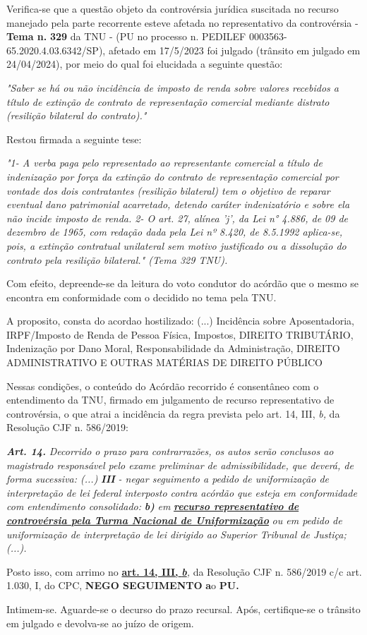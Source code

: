 \documentclass[12pt]{article}
\begin{document}
\justifying
\noindent Verifica-se que a questão objeto da controvérsia jurídica suscitada no recurso manejado pela parte recorrente esteve afetada no representativo da controvérsia - \textbf{Tema n. }\textbf{329} da TNU - (PU no processo n. PEDILEF 0003563-65.2020.4.03.6342/SP),  afetado em 17/5/2023 foi julgado (trânsito em julgado em 24/04/2024), por meio do qual foi elucidada a seguinte questão:

\noindent \textit{"Saber se há ou não incidência de imposto de renda sobre valores recebidos a título de extinção de contrato de representação comercial mediante distrato (resilição bilateral do contrato)."}

\noindent Restou firmada a seguinte tese:

\noindent \textit{"1- A verba paga pelo representado ao representante comercial a título de indenização por força da extinção do contrato de representação comercial por vontade dos dois contratantes (resilição bilateral) tem o objetivo de reparar eventual dano patrimonial acarretado, detendo caráter indenizatório e sobre ela não incide imposto de renda. 2- O art. 27, alínea 'j', da Lei n° 4.886, de 09 de dezembro de 1965, com redação dada pela Lei nº 8.420, de 8.5.1992 aplica-se, pois, a extinção contratual unilateral sem motivo justificado ou a dissolução do contrato pela resilição bilateral." (Tema 329 TNU).}

\noindent Com efeito, depreende-se da leitura do voto condutor do acórdão que o mesmo se encontra em conformidade com o decidido no  tema pela TNU.

\noindent A proposito, consta do acordao hostilizado: (...) Incidência sobre Aposentadoria, IRPF/Imposto de Renda de Pessoa Física, Impostos, DIREITO TRIBUTÁRIO, Indenização por Dano Moral, Responsabilidade da Administração, DIREITO ADMINISTRATIVO E OUTRAS MATÉRIAS DE DIREITO PÚBLICO

\noindent Nessas condições, o conteúdo do Acórdão recorrido é consentâneo com o entendimento da TNU, firmado em julgamento de recurso representativo de controvérsia, o que atrai a incidência da regra prevista pelo art. 14, III, \textit{b,} da Resolução CJF n. 586/2019:

\noindent \textit{\textbf{Art. 14.}}\textit{ Decorrido o prazo para contrarrazões, os autos serão conclusos ao magistrado responsável pelo exame preliminar de admissibilidade, que deverá, de forma sucessiva: (...) }\textit{\textbf{III }}\textit{- negar seguimento a pedido de uniformização de interpretação de lei federal interposto contra acórdão que esteja em conformidade com entendimento consolidado: }\textit{\textbf{b)}}\textit{ em }\uline{\textit{\textbf{recurso representativo de controvérsia pela Turma Nacional de Uniformização}}}\textit{ ou em pedido de uniformização de interpretação de lei dirigido ao Superior Tribunal de Justiça;(...).}

\noindent Posto isso, com arrimo no \uline{\textbf{art. 14, III, }}\uline{\textit{\textbf{b}}}\textit{,} da Resolução CJF n. 586/2019 c/c art. 1.030, I, do CPC, \textbf{NEGO SEGUIMENTO }\textbf{a}o\textbf{ PU}\textbf{.}

\noindent Intimem-se. Aguarde-se o decurso do prazo recursal. Após, certifique-se o trânsito em julgado e devolva-se ao juízo de origem.
\end{document}
